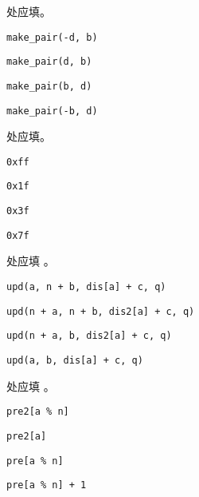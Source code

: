 \documentclass{exam-zh}
\newcommand{\code}[1]{\texttt{#1}}
\begin{document}
\begin{solution}

\end{solution}


\begin{question}
     处应填\paren[A]。
    \begin{choices}
\item \code{make\_pair(-d, b)}
\item \code{make\_pair(d, b)}
\item \code{make\_pair(b, d)}
\item \code{make\_pair(-b, d)}
    \end{choices}
\end{question}


\begin{solution}

\end{solution}


\begin{question}
     处应填\paren[B]。
    \begin{choices}
        \item \code{0xff}
        \item \code{0x1f}
        \item \code{0x3f}
        \item \code{0x7f}
    \end{choices}
\end{question}


\begin{solution}

\end{solution}
\begin{question}
     处应填 \paren[A]。
    \begin{choices}
        \item \code{upd(a, n + b, dis[a] + c, q)}
        \item \code{upd(n + a, n + b, dis2[a] + c, q)}
        \item \code{upd(n + a, b, dis2[a] + c, q)}
        \item \code{upd(a, b, dis[a] + c, q)}
    \end{choices}
\end{question}

\begin{solution}

\end{solution}

\begin{question}
     处应填 \paren[A]。
    \begin{choices}
\item \code{pre2[a \% n]}
\item \code{pre2[a]}
\item \code{pre[a \% n]}
\item \code{pre[a \% n] + 1}
    \end{choices}
\end{question}


\begin{solution}

\end{solution}
\end{document}
